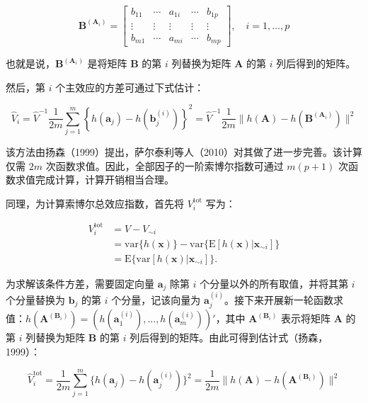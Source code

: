 \documentclass{ctexart}
\begin{document}
\begin{equation*}
\boldsymbol B^{(\boldsymbol{A}_i)}=
\begin{bmatrix}
b_{11}&\cdots&a_{1i}&\cdots&b_{1p}\\
\vdots&\vdots&\vdots&\vdots&\vdots\\
b_{m1}&\cdots&a_{mi}&\cdots&b_{mp}
\end{bmatrix},\quad i=1,\dots,p
\end{equation*}

也就是说，$\boldsymbol B^{(\boldsymbol{A}_i)}$ 是将矩阵 $\boldsymbol B$ 的第 $i$ 列替换为矩阵 $\boldsymbol A$ 的第 $i$ 列后得到的矩阵。

然后，第 $i$ 个主效应的方差可通过下式估计：

\begin{equation*}
\widehat{V}_i=\widehat{V}^{-1}\frac{1}{2m}\sum_{j=1}^m\left\{h(\boldsymbol{a}_j)-h(\boldsymbol{b}_j^{(i)})\right\}^2=\widehat{V}^{-1}\frac{1}{2m}\|h(\boldsymbol{A})-h(\boldsymbol{B}^{(\boldsymbol{A}_i)})\|^2
\tag{6.6}
\end{equation*}

该方法由扬森（1999）提出，萨尔泰利等人（2010）对其做了进一步完善。该计算仅需 $2m$ 次函数求值。因此，全部因子的一阶索博尔指数可通过 $m(p+1)$ 次函数求值完成计算，计算开销相当合理。

同理，为计算索博尔总效应指数，首先将 $V_i^{\text{tot}}$ 写为：

\begin{align*}
V_i^{\text{tot}} &= V - V_{\sim i}\\
&= \mathrm{var}\{h(\boldsymbol{x})\} - \mathrm{var}\{\mathrm{E}[h(\boldsymbol{x})|\boldsymbol{x}_{\sim i}]\}\\
&= \mathrm{E}\{\mathrm{var}[h(\boldsymbol{x})|\boldsymbol{x}_{\sim i}]\}.
\end{align*}

为求解该条件方差，需要固定向量 $\boldsymbol{a}_j$ 除第 $i$ 个分量以外的所有取值，并将其第 $i$ 个分量替换为 $\boldsymbol{b}_j$ 的第 $i$ 个分量，记该向量为 $\boldsymbol{a}_j^{(i)}$。接下来开展新一轮函数求值：$h(\boldsymbol{A}^{(\boldsymbol{B}_i)}) = (h(\boldsymbol{a}_1^{(i)}),\dots,h(\boldsymbol{a}_m^{(i)}))'$，其中 $\boldsymbol{A}^{(\boldsymbol{B}_i)}$ 表示将矩阵 $\boldsymbol{A}$ 的第 $i$ 列替换为矩阵 $\boldsymbol{B}$ 的第 $i$ 列后得到的矩阵。由此可得到估计式（扬森，1999）：

\begin{equation*}
\widehat{V}_i^{\text{tot}}=\frac{1}{2m}\sum_{j=1}^{m}\{h(\boldsymbol{a}_j)-h(\boldsymbol{a}_j^{(i)})\}^2=\frac{1}{2m}\|h(\boldsymbol{A})-h(\boldsymbol{A}^{(\boldsymbol{B}_i)})\|^2
\tag{6.7}
\end{equation*}
\end{document}

